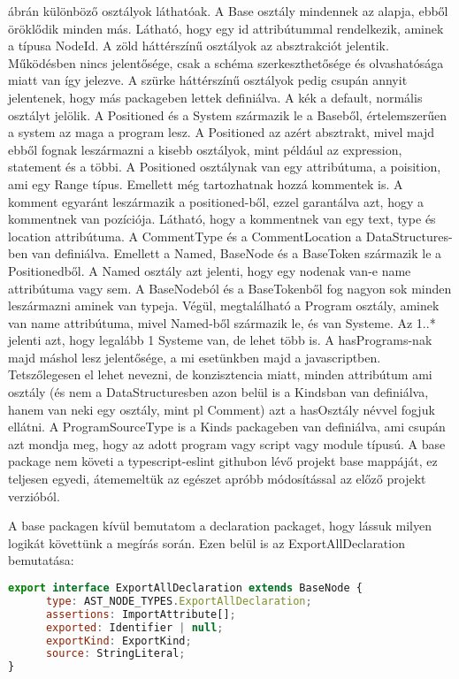  ábrán különböző osztályok láthatóak. A Base osztály mindennek az alapja, ebből öröklődik minden más.
Látható, hogy egy id attribútummal rendelkezik, aminek a típusa NodeId.
A zöld háttérszínű osztályok az absztrakciót jelentik. Működésben nincs jelentősége, csak a schéma szerkeszthetősége és olvashatósága miatt van így jelezve.
A szürke háttérszínű osztályok pedig csupán annyit jelentenek, hogy más packageben lettek definiálva.
A kék a default, normális osztályt jelölik.
A Positioned és a System származik le a Baseből, értelemszerűen a system az maga a program lesz.
A Positioned az azért absztrakt, mivel majd ebből fognak leszármazni a kisebb osztályok, mint például az expression, statement és a többi.
A Positioned osztálynak van egy attribútuma, a poisition, ami egy Range típus. Emellett még tartozhatnak hozzá kommentek is.
A komment egyaránt leszármazik a positioned-ből, ezzel garantálva azt, hogy a kommentnek van pozíciója.
Látható, hogy a kommentnek van egy text, type és location attribútuma. A CommentType és a CommentLocation a DataStructures-ben van definiálva.
Emellett a Named, BaseNode és a BaseToken származik le a Positionedből. A Named osztály azt jelenti, hogy egy nodenak van-e name attribútuma vagy sem.
A BaseNodeból és a BaseTokenből fog nagyon sok minden leszármazni aminek van typeja.
Végül, megtalálható a Program osztály, aminek van name attribútuma, mivel Named-ből származik le, és van Systeme. Az 1..* jelenti azt, hogy legalább 1 Systeme van, de lehet több is.
A hasPrograms-nak majd máshol lesz jelentősége, a mi esetünkben majd a javascriptben.
Tetszőlegesen el lehet nevezni, de konzisztencia miatt, minden attribútum ami osztály (és nem a DataStructuresben azon belül is a Kindsban van definiálva, hanem van neki egy osztály, mint pl Comment)
azt a hasOsztály névvel fogjuk ellátni.
A ProgramSourceType is a Kinds packageben van definiálva, ami csupán azt mondja meg, hogy az adott program vagy script vagy module típusú.
A base package nem követi a typescript-eslint githubon lévő projekt base mappáját, ez teljesen egyedi, átememeltük az egészet apróbb módosítással az előző projekt verzióból.

\noindent

A base packagen kívül bemutatom a declaration packaget, hogy lássuk milyen logikát követtünk a megírás során.
Ezen belül is az ExportAllDeclaration bemutatása:

\begin{lstlisting}[caption={ExportAllDeclaration typescriptes megvalósítása},label={lst:ExportAllDeclaration}, language={JavaScript}]
export interface ExportAllDeclaration extends BaseNode {
      type: AST_NODE_TYPES.ExportAllDeclaration;
      assertions: ImportAttribute[];
      exported: Identifier | null;
      exportKind: ExportKind;
      source: StringLiteral;
}
\end{lstlisting}


